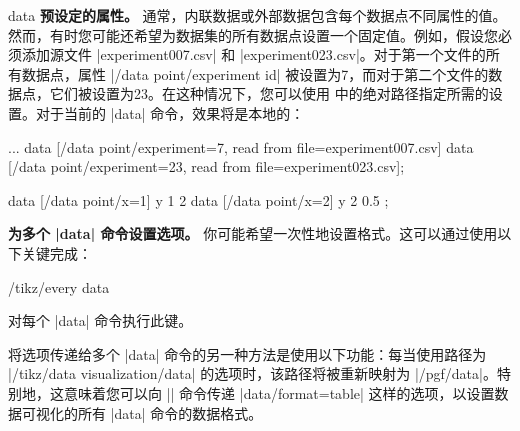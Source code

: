 \begin{datavisualizationoperation}{data}{}
    \textbf{预设定的属性。} 通常，内联数据或外部数据包含每个数据点不同属性的值。然而，有时您可能还希望为数据集的所有数据点设置一个固定值。例如，假设您必须添加源文件 |experiment007.csv| 和 |experiment023.csv|。对于第一个文件的所有数据点，属性 |/data point/experiment id| 被设置为7，而对于第二个文件的数据点，它们被设置为23。在这种情况下，您可以使用  中的绝对路径指定所需的设置。对于当前的 |data| 命令，效果将是本地的：
\begin{codeexample}
\datavisualization...
  data [/data point/experiment=7,  read from file=experiment007.csv]
  data [/data point/experiment=23, read from file=experiment023.csv];
\end{codeexample}

\begin{codeexample}[preamble={\usetikzlibrary{datavisualization}}]
\tikz
    data [/data point/x=1] {
      y
      1
      2
    }
    data [/data point/x=2] {
      y
      2
      0.5
    };
\end{codeexample}


    \medskip

    \textbf{为多个 |data| 命令设置选项。} 你可能希望一次性地设置格式。这可以通过使用以下关键完成：
    \begin{stylekey}{/tikz/every data}

        对每个 |data| 命令执行此键。
    \end{stylekey}


    将选项传递给多个 |data| 命令的另一种方法是使用以下功能：每当使用路径为 |/tikz/data visualization/data| 的选项时，该路径将被重新映射为 |/pgf/data|。特别地，这意味着您可以向 |\datavisualization| 命令传递 |data/format=table| 这样的选项，以设置数据可视化的所有 |data| 命令的数据格式。


    \medskip


\end{datavisualizationoperation}
